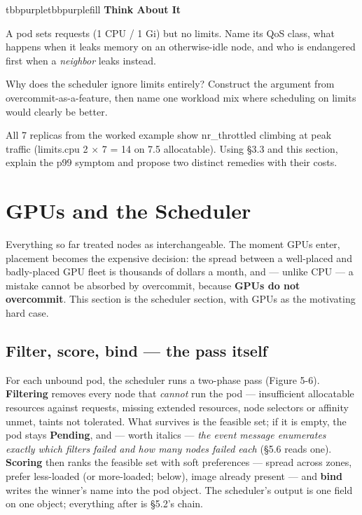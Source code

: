 \begin{calloutbox}{tbbpurple}{tbbpurplefill}
{\normalsize\bfseries\color{tbbpurple}Think About It}\par\vspace{3pt}
\begin{tbbitemize}
  \item A pod sets requests (1 CPU / 1 Gi) but no limits. Name its QoS class, what happens when it leaks memory on an otherwise-idle node, and who is endangered first when a \textit{neighbor} leaks instead.
  \item Why does the scheduler ignore limits entirely? Construct the argument from overcommit-as-a-feature, then name one workload mix where scheduling on limits would clearly be better.
  \item All 7 replicas from the worked example show nr\_throttled climbing at peak traffic (limits.cpu 2 × 7 = 14 on 7.5 allocatable). Using §3.3 and this section, explain the p99 symptom and propose two distinct remedies with their costs.
\end{tbbitemize}
\end{calloutbox}

\section{GPUs and the Scheduler}

Everything so far treated nodes as interchangeable. The moment GPUs enter, placement becomes the expensive decision: the spread between a well-placed and badly-placed GPU fleet is thousands of dollars a month, and — unlike CPU — a mistake cannot be absorbed by overcommit, because \textbf{GPUs do not overcommit}. This section is the scheduler section, with GPUs as the motivating hard case.

\subsection*{Filter, score, bind — the pass itself}

For each unbound pod, the scheduler runs a two-phase pass (Figure 5-6). \textbf{Filtering} removes every node that \textit{cannot} run the pod — insufficient allocatable resources against requests, missing extended resources, node selectors or affinity unmet, taints not tolerated. What survives is the feasible set; if it is empty, the pod stays \textbf{Pending}, and — worth italics — \textit{the event message enumerates exactly which filters failed and how many nodes failed each} (§5.6 reads one). \textbf{Scoring} then ranks the feasible set with soft preferences — spread across zones, prefer less-loaded (or more-loaded; below), image already present — and \textbf{bind} writes the winner's name into the pod object. The scheduler's output is one field on one object; everything after is §5.2's chain.

